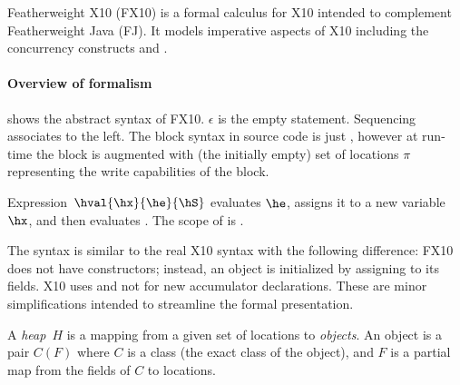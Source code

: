 Featherweight X10 (FX10) is a formal calculus for X10 intended to  complement Featherweight Java
(FJ).  It models imperative aspects of X10 including the concurrency
constructs \hfinish{} and \hasync{}.


\paragraph{Overview of formalism}


 shows the abstract syntax of FX10. 
$\epsilon$ is the empty statement. Sequencing associates to the left.
The block syntax in source code is just \code{\{\hS\}},
however at run-time the block is augmented with (the initially empty) set of locations
$\pi$ representing the write capabilities of the block.

Expression~$\hval{\hx}{\he}{\hS}$ evaluates $\he$, assigns it to a
new variable $\hx$, and then evaluates \hS. The scope of \hx{} is \hS.

The syntax is similar to the real X10 syntax with the following difference:
FX10 does not have constructors; instead, an object is initialized by
assigning to its fields. X10 uses  and not  for new
accumulator declarations. These are minor simplifications intended to
streamline the formal presentation.

A {\em heap}~$H$ is a mapping from a given set of locations to {\em
  objects}. An object is a pair $C(F)$ where $C$ is a class (the exact
class of the object), and $F$ is a partial map from the fields of $C$
to locations.



